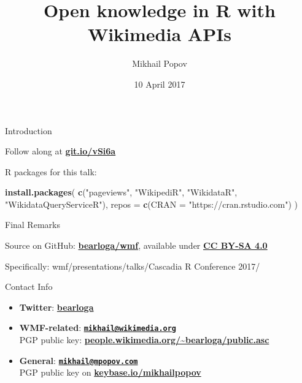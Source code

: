 \documentclass[ignorenonframetext,]{beamer}
\title{Open knowledge in R with Wikimedia APIs}
\author{Mikhail Popov}
\institute{Wikimedia Foundation}
\date{10 April 2017}
\newenvironment{Shaded}{\begin{snugshade}}{\end{snugshade}}
\newcommand{\KeywordTok}[1]{\textcolor[rgb]{0.12,0.11,0.11}{\textbf{#1}}}
\newcommand{\DataTypeTok}[1]{\textcolor[rgb]{0.00,0.34,0.68}{#1}}
\newcommand{\StringTok}[1]{\textcolor[rgb]{0.75,0.01,0.01}{#1}}
\newcommand{\NormalTok}[1]{\textcolor[rgb]{0.12,0.11,0.11}{#1}}
\providecommand{\tightlist}{%
  \setlength{\itemsep}{0pt}\setlength{\parskip}{0pt}}
\let\oldhref\href
\renewcommand{\href}[2]{\oldhref{#1}{\bfseries#2}}
\begin{document}
\frame{\titlepage}

\begin{frame}[fragile]{Introduction}

Follow along at \href{https://git.io/vSi6a}{git.io/vSi6a}

R packages for this talk:

\begin{Shaded}
\begin{Highlighting}[]
\KeywordTok{install.packages}\NormalTok{(}
  \KeywordTok{c}\NormalTok{(}\StringTok{"pageviews"}\NormalTok{, }\StringTok{"WikipediR"}\NormalTok{, }\StringTok{"WikidataR"}\NormalTok{,}
    \StringTok{"WikidataQueryServiceR"}\NormalTok{),}
  \DataTypeTok{repos =} \KeywordTok{c}\NormalTok{(}\DataTypeTok{CRAN =} \StringTok{"https://cran.rstudio.com"}\NormalTok{)}
\NormalTok{)}
\end{Highlighting}
\end{Shaded}

\end{frame}

\begin{frame}{Final Remarks}

Source on GitHub:
\href{https://github.com/bearloga/wmf/tree/master/presentations/talks/Cascadia\%20R\%20Conference\%202017}{bearloga/wmf},
available under
\href{https://creativecommons.org/licenses/by-sa/4.0/}{CC BY-SA 4.0}

Specifically: wmf/presentations/talks/Cascadia R Conference 2017/

\begin{block}{Contact Info}

\begin{itemize}
\tightlist
\item
  \textbf{Twitter}: \href{https://twitter.com/bearloga}{bearloga}
\item
  \textbf{WMF-related}:
  \href{mailto:mikhail@wikimedia.org}{\nolinkurl{mikhail@wikimedia.org}}\\
  PGP public key:
  \href{https://people.wikimedia.org/~bearloga/public.asc}{people.wikimedia.org/\textasciitilde{}bearloga/public.asc}
\item
  \textbf{General}:
  \href{mailto:mikhail@mpopov.com}{\nolinkurl{mikhail@mpopov.com}}\\
  PGP public key on
  \href{https://keybase.io/mikhailpopov}{keybase.io/mikhailpopov}
\end{itemize}

\end{block}

\end{frame}
\end{document}
